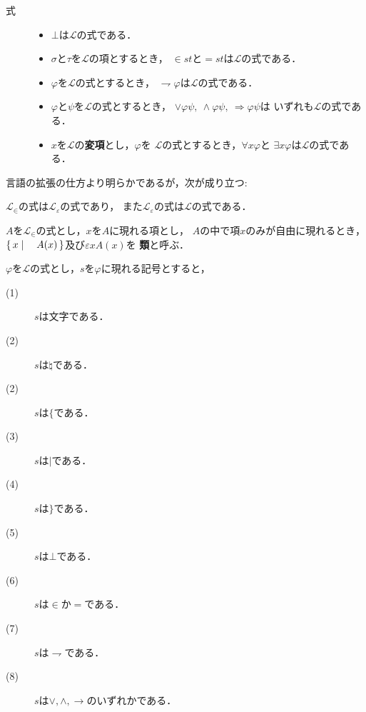 	\begin{description}
		\item[式] 
			\begin{itemize}
				\item $\bot$は$\mathcal{L}$の式である．
				\item $\sigma$と$\tau$を$\mathcal{L}$の項とするとき，
					$\in st$と$=st$は$\mathcal{L}$の式である．
				\item $\varphi$を$\mathcal{L}$の式とするとき，
					$\rightharpoondown \varphi$は$\mathcal{L}$の式である．
				\item $\varphi$と$\psi$を$\mathcal{L}$の式とするとき，
					$\vee \varphi \psi,\ \wedge \varphi \psi,\ \Longrightarrow \varphi \psi$は
					いずれも$\mathcal{L}$の式である．
				\item $x$を$\mathcal{L}$の{\bf 変項}とし，$\varphi$を
					$\mathcal{L}$の式とするとき，$\forall x \varphi$と
					$\exists x \varphi$は$\mathcal{L}$の式である．
			\end{itemize}
	\end{description}
	
	言語の拡張の仕方より明らかであるが，次が成り立つ:
	
	\begin{screen}
		\begin{metathm}
			$\mathcal{L}_{\in}$の式は$\mathcal{L}_{\varepsilon}$の式であり，
			また$\mathcal{L}_{\varepsilon}$の式は$\mathcal{L}$の式である．
		\end{metathm}
	\end{screen}
	
	\begin{screen}
		\begin{dfn}[類]
			$A$を$\mathcal{L}_{\in}$の式とし，$x$を$A$に現れる項とし，
			$A$の中で項$x$のみが自由に現れるとき，
			$\left\{\, x \mid \quad A(x)\, \right\}$及び$\varepsilon x A(x)$を
			{\bf 類}\index{るい@類}{\bf (class)}と呼ぶ．
		\end{dfn}
	\end{screen}
	
	$\varphi$を$\mathcal{L}$の式とし，$s$を$\varphi$に現れる記号とすると，
	\begin{description}
		\item[(1)] $s$は文字である．
		\item[(2)] $s$は$\natural$である．
		\item[(2)] $s$は$\{$である．
		\item[(3)] $s$は$|$である．
		\item[(4)] $s$は$\}$である．
		\item[(5)] $s$は$\bot$である．
		\item[(6)] $s$は$\in$か$=$である．
		\item[(7)] $s$は$\rightharpoondown$である．
		\item[(8)] $s$は$\vee,\wedge,\rightarrow$のいずれかである．
	\end{description}
	

